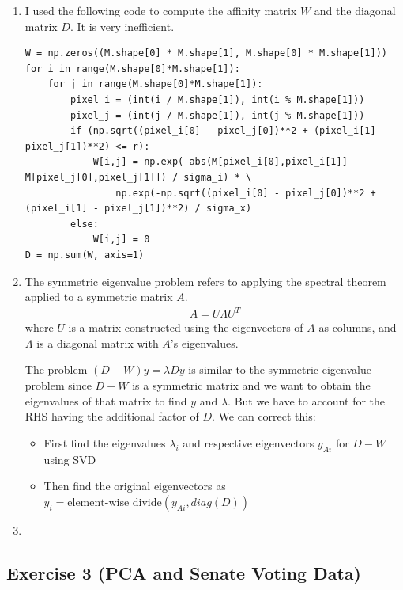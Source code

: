\documentclass[11pt]{article}
\begin{document}
\begin{solution}
\begin{enumerate}
\item I used the following code to compute the affinity matrix $W$ and the diagonal matrix $D$. It is very inefficient.
    \begin{verbatim}
W = np.zeros((M.shape[0] * M.shape[1], M.shape[0] * M.shape[1]))
for i in range(M.shape[0]*M.shape[1]):
    for j in range(M.shape[0]*M.shape[1]):
        pixel_i = (int(i / M.shape[1]), int(i % M.shape[1]))
        pixel_j = (int(j / M.shape[1]), int(j % M.shape[1]))
        if (np.sqrt((pixel_i[0] - pixel_j[0])**2 + (pixel_i[1] - pixel_j[1])**2) <= r):
            W[i,j] = np.exp(-abs(M[pixel_i[0],pixel_i[1]] - M[pixel_j[0],pixel_j[1]]) / sigma_i) * \
                np.exp(-np.sqrt((pixel_i[0] - pixel_j[0])**2 + (pixel_i[1] - pixel_j[1])**2) / sigma_x)
        else:
            W[i,j] = 0
D = np.sum(W, axis=1)
\end{verbatim}

\item The symmetric eigenvalue problem refers to applying the spectral theorem applied to a symmetric matrix $A$.
\begin{align*}
    A = U \Lambda U^T
\end{align*}
where $U$ is a matrix constructed using the eigenvectors of $A$ as columns, and $\Lambda$ is a diagonal matrix with $A$'s eigenvalues.

The problem $(D-W)y = \lambda D y$ is similar to the symmetric eigenvalue problem since $D-W$ is a symmetric matrix and we want to obtain the eigenvalues of that matrix to find $y$ and $\lambda$. But we have to account for the RHS having the additional factor of $D$. We can correct this:

\begin{itemize}
    \item First find the eigenvalues $\lambda_i$ and respective eigenvectors $y_{Ai}$ for $D-W$ using SVD
    \item Then find the original eigenvectors as $y_i = \text{element-wise divide}(y_{Ai}, diag(D))$
\end{itemize}

\item
\end{enumerate}
\end{solution}


\newpage
\subsection*{Exercise 3 (PCA and Senate Voting Data)}
\end{document}
